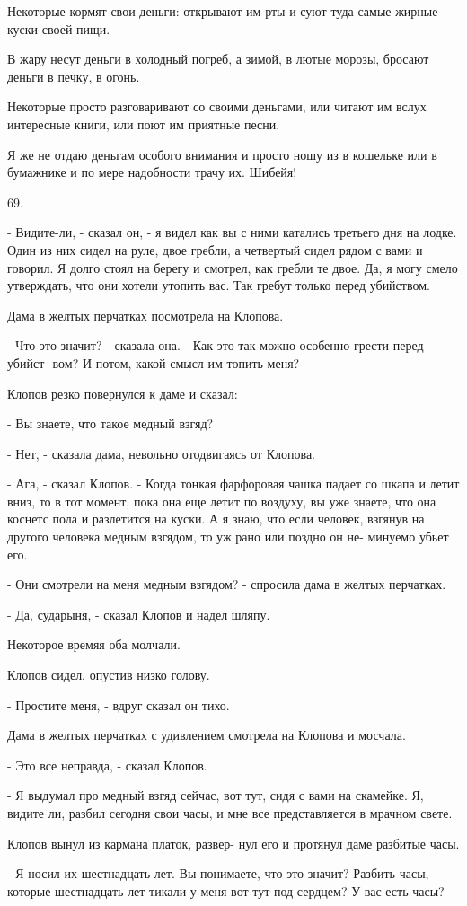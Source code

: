 \documentclass{article}
\begin{document}
Некоторые кормят свои деньги: открывают им рты и суют туда самые жирные куски
своей пищи.
    
В жару несут деньги в холодный погреб, а зимой, в лютые морозы, бросают деньги в
печку, в огонь.
    
Некоторые просто разговаривают со своими деньгами, или читают им вслух
интересные книги, или поют им приятные песни.
    
Я же не отдаю деньгам особого внимания и просто ношу из в кошельке или в
бумажнике и по мере надобности трачу их. Шибейя!

69.
    
- Видите-ли, - сказал он, - я видел как вы с ними катались третьего дня на
  лодке. Один из них сидел на руле, двое гребли, а четвертый сидел рядом с вами
  и говорил. Я долго стоял на берегу и смотрел, как гребли те двое. Да, я могу
  смело утверждать, что они хотели утопить вас. Так гребут только перед
  убийством.
    
Дама в желтых перчатках посмотрела на Клопова.
    
- Что это значит? - сказала она. - Как это так можно особенно грести перед
  убийст- вом? И потом, какой смысл им топить меня?
    
Клопов резко повернулся к даме и сказал:

- Вы знаете, что такое медный взгяд?
    
- Нет, - сказала дама, невольно отодвигаясь от Клопова.
    
- Ага, - сказал Клопов. 
- Когда тонкая фарфоровая чашка падает со шкапа и летит вниз, то в тот момент,
  пока она еще летит по воздуху, вы уже знаете, что она коснетс пола и
  разлетится на куски. А я знаю, что если человек, взгянув на другого человека
  медным взгядом, то уж рано или поздно он не- минуемо убьет его.
    
- Они смотрели на меня медным взгядом? - спросила дама в желтых перчатках.
    
- Да, сударыня, - сказал Клопов и надел шляпу.
    
Некоторое времяя оба молчали.
    
Клопов сидел, опустив низко голову.
    
- Простите меня, - вдруг сказал он тихо.
    
Дама в желтых перчатках с удивлением смотрела на Клопова и мосчала.
    
- Это все неправда, - сказал Клопов. 

- Я выдумал про медный взгяд сейчас, вот тут, сидя с вами на скамейке. Я, видите
  ли, разбил сегодня свои часы, и мне все представляется в мрачном свете.
    
Клопов вынул из кармана платок, развер- нул его и протянул даме разбитые часы.
    
- Я носил их шестнадцать лет. Вы понимаете, что это значит? Разбить часы,
  которые шестнадцать лет тикали у меня вот тут под сердцем? У вас есть часы?
\end{document}
